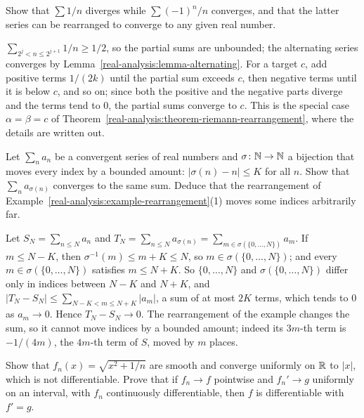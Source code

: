 \begin{exercise}\label{real-analysis:exercise-harmonic}
Show that $\sum 1/n$ diverges while $\sum(-1)^n/n$ converges, and that the latter series can be rearranged to converge to any given real number.
\end{exercise}

\begin{solution}
$\sum_{2^j < n \leq 2^{j+1}}1/n \geq 1/2$, so the partial sums are unbounded; the alternating series converges by Lemma~\ref{real-analysis:lemma-alternating}. For a target $c$, add positive terms
$1/(2k)$ until the partial sum exceeds $c$, then negative terms until it is below $c$, and so on; since both the positive and the negative parts diverge and the terms tend to $0$, the partial sums converge
to $c$. This is the special case $\alpha = \beta = c$ of Theorem~\ref{real-analysis:theorem-riemann-rearrangement}, where the details are written out.
\end{solution}

\begin{exercise}\label{real-analysis:exercise-bounded-rearrangement}
Let $\sum_na_n$ be a convergent series of real numbers and $\sigma \colon \mathbb{N} \to \mathbb{N}$ a bijection that moves every index by a bounded amount: $|\sigma(n) - n| \leq K$ for all $n$. Show that
$\sum_na_{\sigma(n)}$ converges to the same sum. Deduce that the rearrangement of Example~\ref{real-analysis:example-rearrangement}(1) moves some indices arbitrarily far.
\end{exercise}

\begin{solution}
Let $S_N = \sum_{n \leq N}a_n$ and $T_N = \sum_{n \leq N}a_{\sigma(n)} = \sum_{m \in \sigma(\{0, \ldots, N\})}a_m$. If $m \leq N - K$, then $\sigma^{-1}(m) \leq m + K \leq N$, so $m \in \sigma(\{0, \ldots, N\})$;
and every $m \in \sigma(\{0, \ldots, N\})$ satisfies $m \leq N + K$. So $\{0, \ldots, N\}$ and $\sigma(\{0, \ldots, N\})$ differ only in indices between $N - K$ and $N + K$, and
$|T_N - S_N| \leq \sum_{N - K < m \leq N + K}|a_m|$, a sum of at most $2K$ terms, which tends to $0$ as $a_m \to 0$. Hence $T_N - S_N \to 0$. The rearrangement of the example changes the sum, so it
cannot move indices by a bounded amount; indeed its $3m$-th term is $-1/(4m)$, the $4m$-th term of $S$, moved by $m$ places.
\end{solution}

\begin{exercise}\label{real-analysis:exercise-uniform-limit-derivative}
Show that $f_n(x) = \sqrt{x^2 + 1/n}$ are smooth and converge uniformly on $\mathbb{R}$ to $|x|$, which is not differentiable. Prove that if $f_n \to f$ pointwise and $f_n' \to g$ uniformly on an interval, with
$f_n$ continuously differentiable, then $f$ is differentiable with $f' = g$.
\end{exercise}

